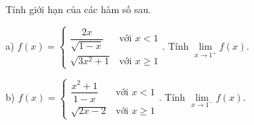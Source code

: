 \begin{ex}
Tính giới hạn của các hàm số sau.

a) $f(x)=\begin{cases}\dfrac{2x}{\sqrt{1-x}}&\text{với }x<1\\\sqrt{3x^2+1}&\text{với }x\ge1\end{cases}$. Tính $\lim\limits_{x\to1^+}f(x)$.

b) $f(x)=\begin{cases}\dfrac{x^2+1}{1-x}&\text{với }x<1\\\sqrt{2x-2}&\text{với }x\ge1\end{cases}$. Tính $\lim\limits_{x\to1^-}f(x)$.
\end{ex}
